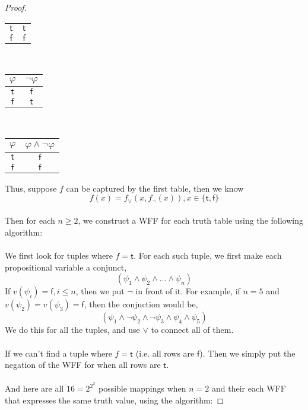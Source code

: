 \documentclass[12pt]{article}
\begin{document}
\begin{proof}
\begin{center}
\begin{tabular}{c|c}
            $\mathsf{t}$ & $\mathsf{t}$\\
            $\mathsf{f}$ & $\mathsf{f}$\\
        \end{tabular}
        ~~~
        \begin{tabular}{c|c}
            $\varphi$ & $\neg \varphi$\\ \hline
            $\mathsf{t}$ & $\mathsf{f}$\\
            $\mathsf{f}$ & $\mathsf{t}$\\
        \end{tabular}
        ~~~
        \begin{tabular}{c|c}
            $\varphi$ & $\varphi \land \neg \varphi$\\ \hline
            $\mathsf{t}$ & $\mathsf{f}$\\
            $\mathsf{f}$ & $\mathsf{f}$\\
        \end{tabular}
    \end{center}
    Thus, suppose $f$ can be captured by the first table, then we know 
    $$f(x) = f_{\lor}(x, f_{\neg}(x)), x \in \{\mathsf{t},\mathsf{f}\}$$
    \\
    Then for each $n \geq 2$, we construct a WFF for each truth table using the following algorithm:\\
    \\
    We first look for tuples where $f = \mathsf{t}$.
    For each such tuple, we first make each propositional variable a conjunct,
    $$(\psi_1 \land \psi_2 \land \dots \land \psi_n)$$
    If $v(\psi_i) = \mathsf{f}, i \leq n$, then we put $\neg$ in front of it.
    For example, if $n = 5$ and $v(\psi_2) = v(\psi_3) = \mathsf{f}$, then the conjuction would be,
    $$(\psi_1 \land \neg \psi_2 \land \neg \psi_3 \land \psi_4 \land \psi_5)$$
    We do this for all the tuples, and use $\lor$ to connect all of them.\\
    \\
    If we can't find a tuple where $f = \mathsf{t}$ (i.e. all rows are $\mathsf{f}$).
    Then we simply put the negation of the WFF for when all rows are $\mathsf{t}$.\\
    \\
    And here are all $16 = 2^{2^2}$ possible mappings when $n = 2$ and their each WFF that expresses the same truth value, using the algorithm:


\end{proof}
\end{document}
